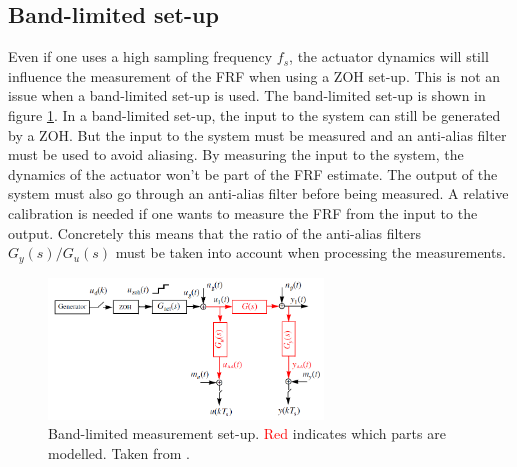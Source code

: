 \subsection{Band-limited set-up}
\label{sec:band-limited}
Even if one uses a high sampling frequency $f_s$, the actuator dynamics will still influence the measurement of the FRF when using a ZOH set-up. This is not an issue when a band-limited set-up is used. The band-limited set-up is shown in figure \ref{fig:BL_setup}. In a band-limited set-up, the input to the system can still be generated by a ZOH. But the input to the system must be measured and an anti-alias filter must be used to avoid aliasing. By measuring the input to the system, the dynamics of the actuator won't be part of the FRF estimate. The output of the system must also go through an anti-alias filter before being measured. A relative calibration is needed if one wants to measure the FRF from the input to the output. Concretely this means that the ratio of the anti-alias filters $G_y(s)/G_u(s)$ must be taken into account when processing the measurements.

\begin{figure}[H]
    \centering
    \includegraphics[width =0.65\textwidth]{figures/BL_setup.png}
    \caption{Band-limited measurement set-up. \textcolor{red}{Red} indicates which parts are modelled. Taken from \cite{identification_of_dynamical_sytems_slides}.}
    \label{fig:BL_setup}
\end{figure}


